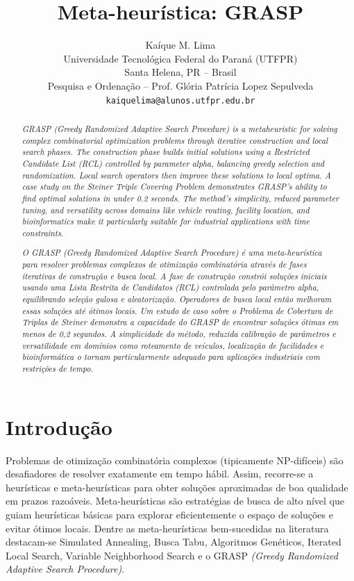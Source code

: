 \documentclass[a4paper, 12pt]{article}
\title{\bf Meta-heurística: GRASP}
\author{%
    Kaíque M. Lima \\
    Universidade Tecnológica Federal do Paraná (UTFPR) \\
    Santa Helena, PR -- Brasil\\[1ex]
    Pesquisa e Ordenação -- Prof. Glória Patrícia Lopez Sepulveda\\
    {\small \texttt{kaiquelima@alunos.utfpr.edu.br}}
}
\date{}  %
\begin{document}
\maketitle

\begin{abstract}
    \textit{
        GRASP (Greedy Randomized Adaptive Search Procedure) is a metaheuristic for solving complex combinatorial optimization problems through iterative construction and local search phases. The construction phase builds initial solutions using a Restricted Candidate List (RCL) controlled by parameter alpha, balancing greedy selection and randomization. Local search operators then improve these solutions to local optima. A case study on the Steiner Triple Covering Problem demonstrates GRASP's ability to find optimal solutions in under 0.2 seconds. The method's simplicity, reduced parameter tuning, and versatility across domains like vehicle routing, facility location, and bioinformatics make it particularly suitable for industrial applications with time constraints.
    }
\end{abstract}

\begin{abstract}
    \textit{
        O GRASP (Greedy Randomized Adaptive Search Procedure) é uma meta-heurística para resolver problemas complexos de otimização combinatória através de fases iterativas de construção e busca local. A fase de construção constrói soluções iniciais usando uma Lista Restrita de Candidatos (RCL) controlada pelo parâmetro alpha, equilibrando seleção gulosa e aleatorização. Operadores de busca local então melhoram essas soluções até ótimos locais. Um estudo de caso sobre o Problema de Cobertura de Triplas de Steiner demonstra a capacidade do GRASP de encontrar soluções ótimas em menos de 0,2 segundos. A simplicidade do método, reduzida calibração de parâmetros e versatilidade em domínios como roteamento de veículos, localização de facilidades e bioinformática o tornam particularmente adequado para aplicações industriais com restrições de tempo.
    }
\end{abstract}

\section{Introdução}
Problemas de otimização combinatória complexos (tipicamente NP-difíceis) são desafiadores de resolver exatamente em tempo hábil. Assim, recorre-se a heurísticas e meta-heurísticas para obter soluções aproximadas de boa qualidade em prazos razoáveis. Meta-heurísticas são estratégias de busca de alto nível que guiam heurísticas básicas para explorar eficientemente o espaço de soluções e evitar ótimos locais. Dentre as meta-heurísticas bem-sucedidas na literatura destacam-se Simulated Annealing, Busca Tabu, Algoritmos Genéticos, Iterated Local Search, Variable Neighborhood Search e o GRASP \textit{(Greedy Randomized Adaptive Search Procedure)}.
\end{document}

